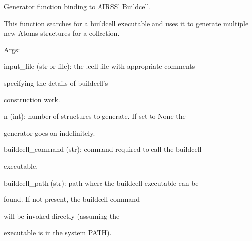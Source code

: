 \documentclass[letterpaper,10pt,english]{sphinxmanual}
\begin{document}
\begin{fulllineitems}
\label{doctree/soprano.collection.generate.airss:soprano.collection.generate.airss.airssGen}
Generator function binding to AIRSS' Buildcell.

This function searches for a buildcell executable and uses it to
generate multiple new Atoms structures for a collection.

\begin{DUlineblock}{0em}
\item[] Args:
\item[]
\begin{DUlineblock}{\DUlineblockindent}
\item[] input\_file (str or file): the .cell file with appropriate comments
\item[]
\begin{DUlineblock}{\DUlineblockindent}
\item[] specifying the details of buildcell's
\item[] construction work.
\end{DUlineblock}
\item[] n (int): number of structures to generate. If set to None the
\item[]
\begin{DUlineblock}{\DUlineblockindent}
\item[] generator goes on indefinitely.
\end{DUlineblock}
\item[] buildcell\_command (str): command required to call the buildcell
\item[]
\begin{DUlineblock}{\DUlineblockindent}
\item[] executable.
\end{DUlineblock}
\item[] buildcell\_path (str): path where the buildcell executable can be
\item[]
\begin{DUlineblock}{\DUlineblockindent}
\item[] found. If not present, the buildcell command
\item[] will be invoked directly (assuming the
\item[] executable is in the system PATH).
\end{DUlineblock}

\end{DUlineblock}
\end{DUlineblock}
\end{fulllineitems}
\end{document}
